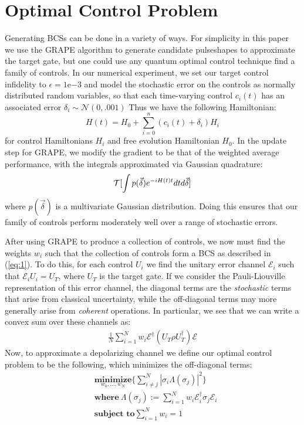 \documentclass[aps,nofootinbib,pra,notitlepage,twocolumn]{revtex4-1}
\begin{document}
\section{Optimal Control Problem}
Generating BCSs can be done in a variety of ways. For simplicity in this paper we use the GRAPE algorithm to generate candidate pulseshapes to approximate the target gate, but one could use any quantum optimal control technique find a family of controls. In our numerical experiment, we set our target control infidelity to $\epsilon=1\mathrm{e}{-3}$ and model the stochastic error on the controls as normally distributed random variables, so that each time-varying control $c_i(t)$ has an associated error $\delta_i \mathtt{\sim} \mathcal{N}(0, .001)$
Thus we have the following Hamiltonian:
\begin{equation}\label{eq:2}
  H(t) = H_0 + \sum_{i=0}^n (c_i(t) + \delta_i)H_i
\end{equation}
for control Hamiltonians $H_i$ and free evolution Hamiltonian $H_0$. In the update step for GRAPE, we modify the gradient to be that of the weighted average performance, with the integrals approximated via Gaussian quadrature:
\begin{equation}
   \mathcal{T}[\int p(\vec{\delta})e^{-iH(t)t}dtd\vec{\delta}]\\
\end{equation}
where $p(\vec{\delta})$ is a multivariate Gaussian distribution.
Doing this ensures that our family of controls perform moderately well over a range of stochastic errors.

After using GRAPE to produce a collection of controls, we now must find the weights $w_i$ such that the collection of controls form a BCS as described in (\ref{eq:1}). To do this, for each control $U_i$ we find the unitary error channel $\mathcal{E}_i$ such that $\mathcal{E}_iU_i=U_T$, where $U_T$ is the target gate. If we consider the Pauli-Liouville representation of this error channel, the diagonal terms are the \textit{stochastic} terms that arise from classical uncertainty, while the off-diagonal terms may more generally arise from \textit{coherent} operations. In particular, we see that we can write a convex sum over these channels as:
\begin{align}
 \frac{1}{N} \sum^N_{i=1} w_i \mathcal{E}^{\dagger} (U_T\rho U_T^{\dagger}) \mathcal{E}
\end{align}
Now, to approximate a depolarizing channel we define our optimal control problem to be the following, which minimizes the off-diagonal terms:
\begin{equation}
  \begin{align}
   &\underset{w_0, ..., w_N}{\textbf{minimize}} \{\sum_{i\neq j}^N|\sigma_i\Lambda(\sigma_j)|^2\}\\
   &\textbf{where}\ \Lambda(\sigma_j) := \sum^N_{i=1}w_i\mathcal{E}_i^{\dagger}\sigma_j\mathcal{E}_i\\
   &\textbf{subject to} \sum_{i=1}^Nw_i = 1
  \end{align}
\end{equation}
\end{document}
